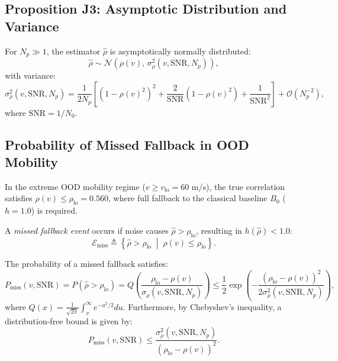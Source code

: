 \subsection{Proposition J3: Asymptotic Distribution and Variance}
\begin{proposition}
For $N_p \gg 1$, the estimator $\hat{\rho}$ is asymptotically normally distributed:
\begin{equation}
    \hat{\rho} \sim \mathcal{N}\left( \rho(v), \, \sigma_{\rho}^2(v, \mathrm{SNR}, N_p) \right),
\end{equation}
with variance:
\begin{equation}
    \sigma_{\rho}^2(v, \mathrm{SNR}, N_p) = \frac{1}{2 N_p} \left[ \left(1 - \rho(v)^2\right)^2 + \frac{2}{\mathrm{SNR}} \left(1 - \rho(v)^2\right) + \frac{1}{\mathrm{SNR}^2} \right] + \mathcal{O}\left(N_p^{-2}\right),
\end{equation}
where $\mathrm{SNR} = 1 / N_0$.
\end{proposition}

\subsection{Probability of Missed Fallback in OOD Mobility}
In the extreme OOD mobility regime ($v \ge v_{\mathrm{lo}} = 60\text{ m/s}$), the true correlation satisfies $\rho(v) \le \rho_{\mathrm{lo}} = 0.560$, where full fallback to the classical baseline $B_0$ ($h = 1.0$) is required. 

A \emph{missed fallback event} occurs if noise causes $\hat{\rho} > \rho_{\mathrm{lo}}$, resulting in $h(\hat{\rho}) < 1.0$:
\begin{equation}
    \mathcal{E}_{\mathrm{miss}} \triangleq \left\{ \hat{\rho} > \rho_{\mathrm{lo}} \;\middle|\; \rho(v) \le \rho_{\mathrm{lo}} \right\}.
\end{equation}

\begin{corollary}
The probability of a missed fallback satisfies:
\begin{equation}
    P_{\mathrm{miss}}(v, \mathrm{SNR}) = P\left( \hat{\rho} > \rho_{\mathrm{lo}} \right) = Q\left( \frac{\rho_{\mathrm{lo}} - \rho(v)}{\sigma_{\rho}(v, \mathrm{SNR}, N_p)} \right) \le \frac{1}{2} \exp\left( - \frac{(\rho_{\mathrm{lo}} - \rho(v))^2}{2 \sigma_{\rho}^2(v, \mathrm{SNR}, N_p)} \right),
\end{equation}
where $Q(x) = \frac{1}{\sqrt{2\pi}} \int_x^\infty e^{-u^2/2} du$. Furthermore, by Chebyshev's inequality, a distribution-free bound is given by:
\begin{equation}
    P_{\mathrm{miss}}(v, \mathrm{SNR}) \le \frac{\sigma_{\rho}^2(v, \mathrm{SNR}, N_p)}{(\rho_{\mathrm{lo}} - \rho(v))^2}.
\end{equation}
\end{corollary}

